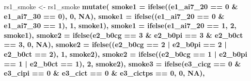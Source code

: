 \documentclass[]{book}
\newenvironment{Shaded}{\begin{snugshade}}{\end{snugshade}}
\newcommand{\DataTypeTok}[1]{\textcolor[rgb]{0.13,0.29,0.53}{#1}}
\newcommand{\DecValTok}[1]{\textcolor[rgb]{0.00,0.00,0.81}{#1}}
\newcommand{\KeywordTok}[1]{\textcolor[rgb]{0.13,0.29,0.53}{\textbf{#1}}}
\newcommand{\NormalTok}[1]{#1}
\newcommand{\OperatorTok}[1]{\textcolor[rgb]{0.81,0.36,0.00}{\textbf{#1}}}
\newcommand{\OtherTok}[1]{\textcolor[rgb]{0.56,0.35,0.01}{#1}}
\newcommand{\StringTok}[1]{\textcolor[rgb]{0.31,0.60,0.02}{#1}}
\begin{document}
\begin{Shaded}
\begin{Highlighting}[]
\NormalTok{rs1_smoke <-}\StringTok{ }\NormalTok{rs1_smoke }\OperatorTok{%
\StringTok{  }\KeywordTok{mutate}\NormalTok{(}
    \DataTypeTok{smoke1 =} \KeywordTok{ifelse}\NormalTok{((e1_ai7_}\DecValTok{20} \OperatorTok{==}\StringTok{ }\DecValTok{0} \OperatorTok{&}\StringTok{ }\NormalTok{e1_ai7_}\DecValTok{30} \OperatorTok{==}\StringTok{ }\DecValTok{0}\NormalTok{), }\DecValTok{0}\NormalTok{, }\OtherTok{NA}\NormalTok{),}
    \DataTypeTok{smoke1 =} \KeywordTok{ifelse}\NormalTok{((e1_ai7_}\DecValTok{20} \OperatorTok{==}\StringTok{ }\DecValTok{0} \OperatorTok{&}
\StringTok{                       }\NormalTok{e1_ai7_}\DecValTok{30} \OperatorTok{==}\StringTok{ }\DecValTok{1}\NormalTok{), }\DecValTok{1}\NormalTok{, smoke1),}
    \DataTypeTok{smoke1 =} \KeywordTok{ifelse}\NormalTok{(e1_ai7_}\DecValTok{20} \OperatorTok{==}\StringTok{ }\DecValTok{1}\NormalTok{, }\DecValTok{2}\NormalTok{, smoke1),}
    \DataTypeTok{smoke2 =} \KeywordTok{ifelse}\NormalTok{(e2_b0cg }\OperatorTok{==}\StringTok{ }\DecValTok{3} \OperatorTok{&}
\StringTok{                      }\NormalTok{e2_b0pi }\OperatorTok{==}\StringTok{ }\DecValTok{3} \OperatorTok{&}\StringTok{ }\NormalTok{e2_b0ct }\OperatorTok{==}\StringTok{ }\DecValTok{3}\NormalTok{, }\DecValTok{0}\NormalTok{, }\OtherTok{NA}\NormalTok{),}
    \DataTypeTok{smoke2 =} \KeywordTok{ifelse}\NormalTok{((e2_b0cg }\OperatorTok{==}\StringTok{ }\DecValTok{2} \OperatorTok{|}
\StringTok{                       }\NormalTok{e2_b0pi }\OperatorTok{==}\StringTok{ }\DecValTok{2} \OperatorTok{|}\StringTok{ }\NormalTok{e2_b0ct }\OperatorTok{==}\StringTok{ }\DecValTok{2}\NormalTok{), }\DecValTok{1}\NormalTok{, smoke2),}
    \DataTypeTok{smoke2 =} \KeywordTok{ifelse}\NormalTok{((e2_b0cg }\OperatorTok{==}\StringTok{ }\DecValTok{1} \OperatorTok{|}
\StringTok{                       }\NormalTok{e2_b0pi }\OperatorTok{==}\StringTok{ }\DecValTok{1} \OperatorTok{|}\StringTok{ }\NormalTok{e2_b0ct }\OperatorTok{==}\StringTok{ }\DecValTok{1}\NormalTok{), }\DecValTok{2}\NormalTok{, smoke2),}
    \DataTypeTok{smoke3 =} \KeywordTok{ifelse}\NormalTok{(e3_cicg }\OperatorTok{==}\StringTok{ }\DecValTok{0} \OperatorTok{&}
\StringTok{                      }\NormalTok{e3_cipi }\OperatorTok{==}\StringTok{ }\DecValTok{0} \OperatorTok{&}\StringTok{ }\NormalTok{e3_cict }\OperatorTok{==}\StringTok{ }\DecValTok{0} \OperatorTok{&}\StringTok{ }\NormalTok{e3_cictps }\OperatorTok{==}\StringTok{ }\DecValTok{0}\NormalTok{, }\DecValTok{0}\NormalTok{, }\OtherTok{NA}\NormalTok{),}
}
\end{Highlighting}
\end{Shaded}
\end{document}
